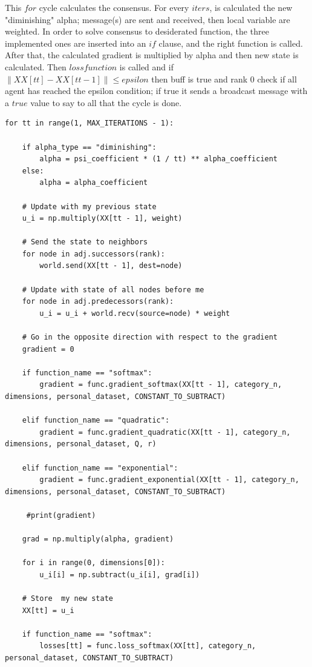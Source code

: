 \documentclass[a4paper,11pt,oneside]{book}
\begin{document}
This $for$ cycle calculates the consensus. For every $iters$, is calculated the new "diminishing" alpha; message(s) are sent
and received, then local variable are weighted. In order to solve consensus to desiderated function, the three implemented
ones are inserted into an $if$ clause, and the right function is called. After that, the calculated gradient is multiplied by
alpha and then new state is calculated. Then $loss function$ is called and if $\left\lVert XX[tt] - XX[tt-1] \right\rVert
\leq epsilon$ then buff is true and rank 0 check if all agent has reached the epsilon condition; if true it sends a broadcast 
message with a $true$ value to say to all that the cycle is done.

\begin{lstlisting}
for tt in range(1, MAX_ITERATIONS - 1):

    if alpha_type == "diminishing":
        alpha = psi_coefficient * (1 / tt) ** alpha_coefficient
    else:
        alpha = alpha_coefficient

    # Update with my previous state
    u_i = np.multiply(XX[tt - 1], weight)

    # Send the state to neighbors
    for node in adj.successors(rank):
        world.send(XX[tt - 1], dest=node)

    # Update with state of all nodes before me
    for node in adj.predecessors(rank):
        u_i = u_i + world.recv(source=node) * weight

    # Go in the opposite direction with respect to the gradient
    gradient = 0

    if function_name == "softmax":
        gradient = func.gradient_softmax(XX[tt - 1], category_n, dimensions, personal_dataset, CONSTANT_TO_SUBTRACT)

    elif function_name == "quadratic":
        gradient = func.gradient_quadratic(XX[tt - 1], category_n, dimensions, personal_dataset, Q, r)

    elif function_name == "exponential":
        gradient = func.gradient_exponential(XX[tt - 1], category_n, dimensions, personal_dataset, CONSTANT_TO_SUBTRACT)

     #print(gradient)

    grad = np.multiply(alpha, gradient)

    for i in range(0, dimensions[0]):
        u_i[i] = np.subtract(u_i[i], grad[i])

    # Store  my new state
    XX[tt] = u_i

    if function_name == "softmax":
        losses[tt] = func.loss_softmax(XX[tt], category_n, personal_dataset, CONSTANT_TO_SUBTRACT)


\end{lstlisting}
\end{document}
